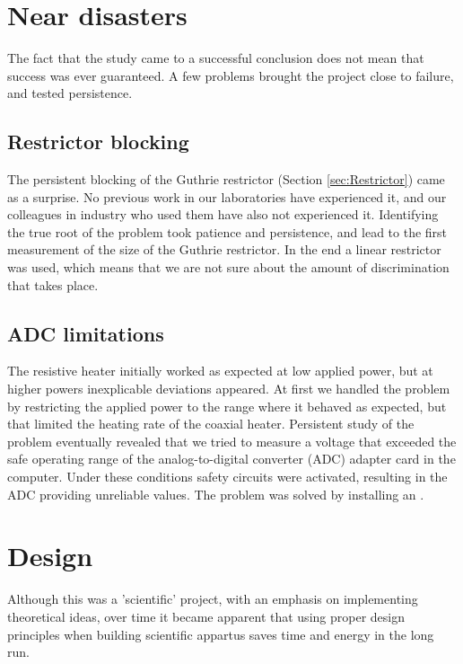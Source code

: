 \section{Near disasters}

The fact that the study came to a successful conclusion does not mean that
success was ever guaranteed. A few problems brought the project close to
failure, and tested persistence.

\subsection{Restrictor blocking}

The persistent blocking of the Guthrie restrictor (Section \ref{sec:Restrictor})
came as a surprise. No previous work in our laboratories have experienced it,
and our colleagues in industry who used them have also not experienced it.
Identifying the true root of the problem took patience and persistence, and lead
to the first measurement of the size of the Guthrie restrictor. In the end a
linear restrictor was used, which means that we are not sure about the amount of
discrimination that takes place.

\subsection{ADC limitations}

The resistive heater initially worked as expected at low applied power, but at
higher powers inexplicable deviations appeared. At first we handled the problem
by restricting the applied power to the range where it behaved as expected, but
that limited the heating rate of the coaxial heater. Persistent study of the
problem eventually revealed that we tried to measure a voltage that exceeded the
safe operating range of the analog-to-digital converter (ADC) adapter card in
the computer. Under these conditions safety circuits were activated, resulting
in the ADC providing unreliable values. The problem was solved by installing an
.


\section{Design}

Although this was a 'scientific' project, with an emphasis on implementing
theoretical ideas, over time it became apparent that using proper design
principles when building scientific appartus saves time and energy in the long
run.

